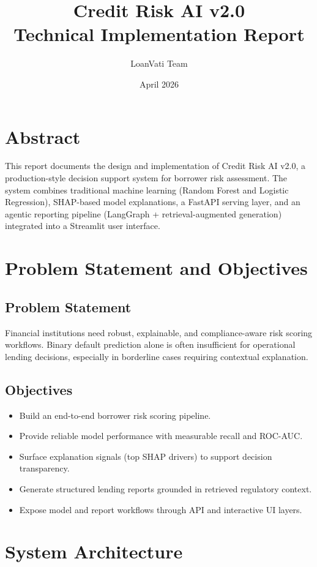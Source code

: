 \documentclass[12pt,a4paper]{article}
\title{Credit Risk AI v2.0\\\large Technical Implementation Report}
\author{LoanVati Team}
\date{April 2026}
\begin{document}
\maketitle
\tableofcontents
\newpage

\section{Abstract}
This report documents the design and implementation of Credit Risk AI v2.0, a production-style decision support system for borrower risk assessment. The system combines traditional machine learning (Random Forest and Logistic Regression), SHAP-based model explanations, a FastAPI serving layer, and an agentic reporting pipeline (LangGraph + retrieval-augmented generation) integrated into a Streamlit user interface.

\section{Problem Statement and Objectives}
\subsection{Problem Statement}
Financial institutions need robust, explainable, and compliance-aware risk scoring workflows. Binary default prediction alone is often insufficient for operational lending decisions, especially in borderline cases requiring contextual explanation.

\subsection{Objectives}
\begin{itemize}[leftmargin=1.5em]
  \item Build an end-to-end borrower risk scoring pipeline.
  \item Provide reliable model performance with measurable recall and ROC-AUC.
  \item Surface explanation signals (top SHAP drivers) to support decision transparency.
  \item Generate structured lending reports grounded in retrieved regulatory context.
  \item Expose model and report workflows through API and interactive UI layers.
\end{itemize}

\section{System Architecture}
\end{document}
